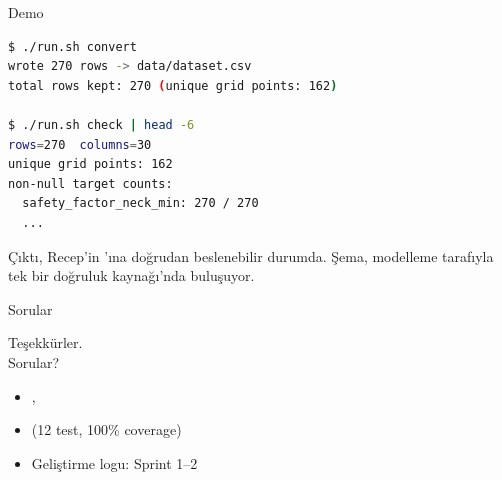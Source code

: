 \begin{frame}[fragile]{Demo}
\begin{lstlisting}[language=bash, basicstyle=\ttfamily\small]
$ ./run.sh convert
wrote 270 rows -> data/dataset.csv
total rows kept: 270 (unique grid points: 162)

$ ./run.sh check | head -6
rows=270  columns=30
unique grid points: 162
non-null target counts:
  safety_factor_neck_min: 270 / 270
  ...
\end{lstlisting}

  \vspace{0.4cm}
  Çıktı, Recep'in 'ına doğrudan beslenebilir durumda.
  Şema, modelleme tarafıyla \alert{tek bir doğruluk kaynağı}'nda buluşuyor.
\end{frame}

\begin{frame}{Sorular}
  \vfill
  \begin{center}
    \Large Teşekkürler.\\[0.4cm]
    \normalsize Sorular?
  \end{center}
  \vfill
  \scriptsize
  \begin{itemize}
    \item {}, 
    \item {} (12 test, 100\% coverage)
    \item Geliştirme logu:  Sprint 1--2
  \end{itemize}
\end{frame}


